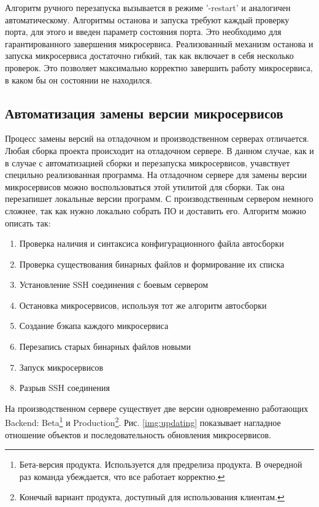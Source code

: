 Алгоритм ручного перезапуска вызывается в режиме '-restart' и аналогичен автоматическому. Алгоритмы останова и запуска требуют каждый проверку порта, для этого и введен параметр состояния порта. Это необходимо для гарантированного завершения микросервиса. 
Реализованный механизм останова и запуска микросервиса достаточно гибкий, так как включает в себя несколько проверок. Это позволяет максимально корректно завершить работу микросервиса, в каком бы он состоянии не находился.


\subsection{Автоматизация замены версии микросервисов}

Процесс замены версий на отладочном и производственном серверах отличается. Любая сборка проекта происходит на отладочном сервере. В данном случае, как и в случае с автоматизацией сборки и перезапуска микросервисов, учавствует специльно реализованная программа. На отладочном сервере для замены версии микросервисов можно воспользоваться этой утилитой для сборки. Так она перезапишет локальные версии программ. С производственным сервером немного сложнее, так как нужно локально собрать ПО и доставить его. Алгоритм можно описать так:
\begin{enumerate}
	\item Проверка наличия и синтаксиса конфигурационного файла автосборки
	\item Проверка существования бинарных файлов и формирование их списка
	\item Установление SSH соединения с боевым сервером
	\item Остановка микросервисов, используя тот же алгоритм автосборки
	\item Создание бэкапа каждого микросервиса
	\item Перезапись старых бинарных файлов новыми
	\item Запуск микросервисов
	\item Разрыв SSH соединения
\end{enumerate}
На производственном сервере существует две версии одновременно работающих Backend: Beta\footnote{Бета-версия продукта. Используется для предрелиза продукта. В очередной раз команда убеждается, что все работает корректно.} и Production\footnote{Конечый вариант продукта, доступный для использования клиентам.}. Рис. \ref{img:updating} показывает нагладное отношение объектов и последовательность обновления микросервисов.


